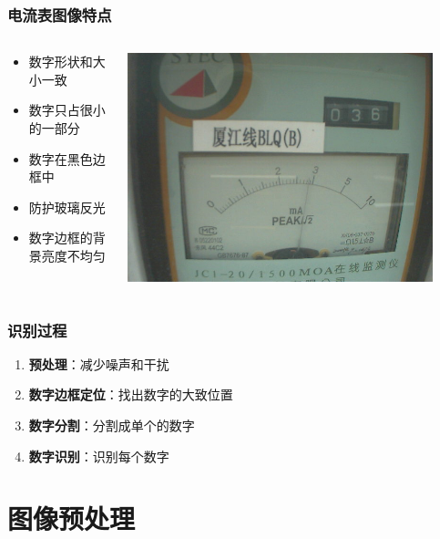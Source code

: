 \documentclass[12pt,hyperref={CJKbookmarks=true}]{beamer}
\begin{document}
\begin{frame}
  \frametitle{电流表图像特点}
  \begin{columns}[onlytextwidth]
    \begin{column}{0.6\textwidth}
      \begin{itemize}
      \item 数字形状和大小一致
      \item 数字只占很小的一部分
      \item 数字在黑色边框中
      \item 防护玻璃反光
      \item 数字边框的背景亮度不均匀
      \end{itemize}
    \end{column}
    \begin{column}{0.4\textwidth}
      \centering
      \includegraphics[width=0.9\textwidth]{src.png}
    \end{column}
  \end{columns}
\end{frame}

\begin{frame}
  \frametitle{识别过程}
  \begin{enumerate}
  \item \textbf{预处理}：减少噪声和干扰
  \item \textbf{数字边框定位}：找出数字的大致位置
  \item \textbf{数字分割}：分割成单个的数字
  \item \textbf{数字识别}：识别每个数字
  \end{enumerate}
\end{frame}
\section{图像预处理}
\end{document}
